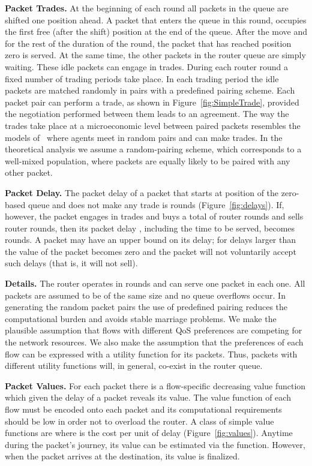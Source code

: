 \documentclass[letterpaper,10pt]{llncs}
\begin{document}
\textbf{Packet Trades.}
At the beginning of each round all packets in the queue are shifted one position ahead.
A packet that enters the queue in this round, occupies the first free (after the shift) 
position at the end of the queue. After the move and for the rest of the duration of the round,
the packet that has reached position zero is served.
At the same time, the other packets
in the router queue are simply waiting. These idle packets can engage in trades.
During each router round a fixed number  of trading periods take place.
In each trading period the idle packets are matched randomly in pairs
with a predefined pairing scheme.
Each packet pair can perform a trade, as shown in Figure~\ref{fig:SimpleTrade},
provided
the negotiation performed between them leads to an agreement.
The way the trades take place at a microeconomic level
between paired packets resembles the models of~\cite{Gi97,KW89}
where agents meet in random pairs and can make trades.
In the theoretical analysis we assume a random-pairing scheme,
which corresponds to a well-mixed population, where packets 
are equally likely to be paired with any other packet. 

\textbf{Packet Delay.}
The packet delay  of a packet  that starts at position 
of the zero-based queue and does not make any trade is  rounds (Figure~\ref{fig:delays}).
If, however, the packet engages in trades and buys a total of  router rounds
and sells  router rounds, then its packet delay , including the time to be served,
becomes  rounds. A packet may have an upper bound  on its
delay; for delays larger than  the value of the packet becomes zero and the packet 
will not voluntarily accept such delays (that is, it will not sell).

\textbf{Details.}
The router operates in rounds and can serve one packet in each one.
All packets are assumed to be of the same size and no queue overflows occur.
In generating the random packet pairs the use of predefined pairing reduces
the computational burden and avoids stable marriage problems.
We make the plausible assumption that flows with different QoS
preferences are competing for the network resources. We also make the
assumption that the preferences of each flow can be expressed with a utility function
for its packets. Thus, packets with different utility functions will, in general, co-exist in 
the router queue.

\textbf{Packet Values.}
For each packet there is a flow-specific decreasing value function 
which given the delay  of a packet reveals its value. 
The value function of each flow must be encoded
onto each packet and its computational requirements should be low in order not
to overload the router. A class of simple value functions are
 where  is the cost per unit
of delay (Figure~\ref{fig:values}).
Anytime during the packet's journey, its value can be estimated via the  function.
However, when the packet arrives at the destination, its value is finalized. 
\end{document}
